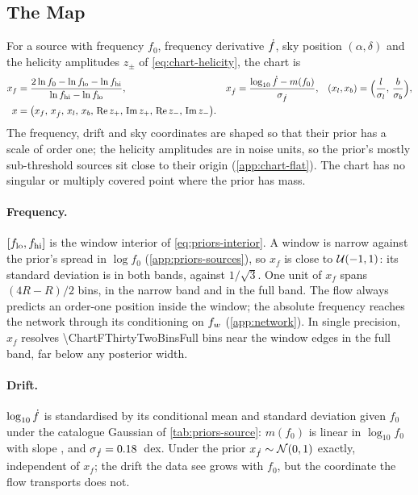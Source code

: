 \subsection{The Map}
\label{app:chart-map}

For a source with frequency $f_0$, frequency derivative $\dot f$, sky position $(\alpha,\delta)$
and the helicity amplitudes $z_\pm$ of \cref{eq:chart-helicity}, the chart is
\begin{equation}
\begin{aligned}
  x_f &= \frac{2\ln f_0 - \ln f_{\rm lo} - \ln f_{\rm hi}}{\ln f_{\rm hi} - \ln f_{\rm lo}}, &
  x_{\dot f} &= \frac{\log_{10}\dot f - m(f_0)}{\sigma_{\dot f}}, &
  (x_l, x_b) &= \Bigl(\frac{l}{\sigma_l},\,\frac{b}{\sigma_b}\Bigr), \\
  x &= \bigl(x_f,\, x_{\dot f},\, x_l,\, x_b,\, \operatorname{Re}z_+,\, \operatorname{Im}z_+,\,
  \operatorname{Re}z_-,\, \operatorname{Im}z_-\bigr).
\end{aligned}
\label{eq:chart}
\end{equation}
The frequency, drift and sky coordinates are shaped so that their prior has a scale of order one;
the helicity amplitudes are in noise units, so the prior's mostly sub-threshold sources sit close
to their origin (\cref{app:chart-flat}). The chart has no singular or multiply covered point where
the prior has mass.

\paragraph{Frequency.}
$[f_{\rm lo}, f_{\rm hi}]$ is the window interior of \cref{eq:priors-interior}. A window is
narrow against the prior's spread in $\log f_0$ (\cref{app:priors-sources}), so $x_f$ is close to
$\mathcal{U}(-1,1)$: its standard deviation is \ChartXfStd{} in both bands, against $1/\sqrt3$. One unit
of $x_f$ spans $(4R-R)/2$ bins, \ChartBinsPerUnitNarrow{} in the narrow band and
\ChartBinsPerUnitFull{} in the full band. The flow always predicts an order-one position inside the
window; the absolute frequency reaches the network through its conditioning on $f_{w}$
(\cref{app:network}). In single precision, $x_f$ resolves \num{\ChartFThirtyTwoBinsFull} bins near
the window edges in the full band, far below any posterior width.

\paragraph{Drift.}
$\log_{10}\dot f$ is standardised by its conditional mean and standard deviation given $f_0$ under
the catalogue Gaussian of \cref{tab:priors-source}: $m(f_0)$ is linear in $\log_{10}f_0$ with
slope \ChartFdotSlope{}, and $\sigma_{\dot f} = 0.18{}$~dex. Under the prior
$x_{\dot f}\sim\mathcal N(0,1)$ exactly, independent of $x_f$; the drift the data see grows with
$f_0$, but the coordinate the flow transports does not.


